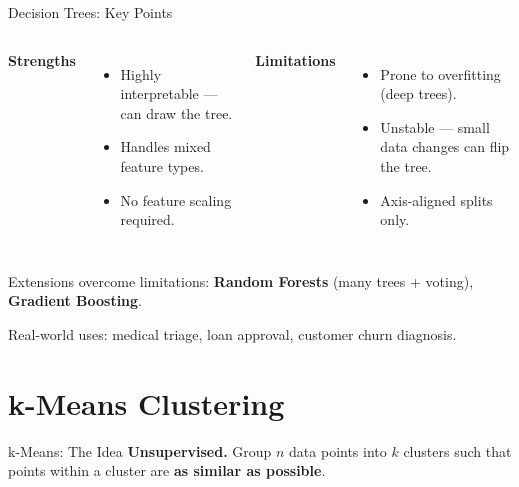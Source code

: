 \documentclass[10pt]{beamer}
\begin{document}
\begin{frame}{Decision Trees: Key Points}
    \begin{columns}[T,onlytextwidth]
        \textbf{Strengths}
        \begin{itemize}
            \item Highly interpretable — can draw the tree.
            \item Handles mixed feature types.
            \item No feature scaling required.
        \end{itemize}
        \textbf{Limitations}
        \begin{itemize}
            \item Prone to overfitting (deep trees).
            \item Unstable — small data changes can flip the tree.
            \item Axis-aligned splits only.
        \end{itemize}
    \end{columns}
    \vspace{0.25cm}
    Extensions overcome limitations: \textbf{Random Forests} (many trees + voting), \textbf{Gradient Boosting}.

    \vspace{0.15cm}
    Real-world uses: medical triage, loan approval, customer churn diagnosis.
\end{frame}

\section{k-Means Clustering}

\begin{frame}{k-Means: The Idea}
    \textbf{Unsupervised.} Group $n$ data points into $k$ clusters such that points within a cluster are \textbf{as similar as possible}.

    \vspace{0.2cm}
    \begin{center}
    \end{center}
\end{frame}
\end{document}
